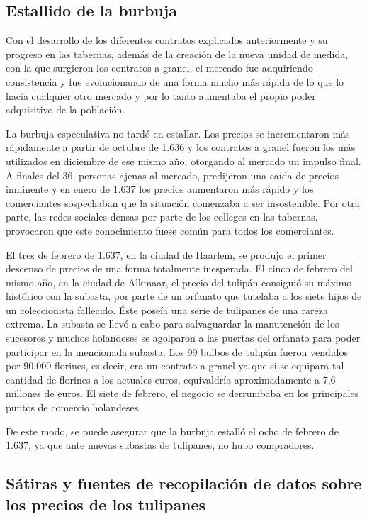 \subsection{Estallido de la burbuja}

Con el desarrollo de los diferentes contratos explicados anteriormente y su progreso en las tabernas, además de la creación de la nueva unidad de medida, con la que surgieron los contratos a granel, el mercado fue adquiriendo consistencia y fue evolucionando de una forma mucho más rápida de lo que lo hacía cualquier otro mercado y por lo tanto aumentaba el propio poder adquisitivo de la población.

La burbuja especulativa no tardó en estallar. Los precios se incrementaron más rápidamente a partir de octubre de 1.636 y los contratos a granel fueron los más utilizados en diciembre de ese mismo año, otorgando al mercado un impulso final. A finales del 36, personas ajenas al mercado, predijeron una caída de precios inminente y en enero de 1.637 los precios aumentaron más rápido y los comerciantes sospechaban que la situación comenzaba a ser insostenible. Por otra parte, las redes sociales densas por parte de los colleges en las tabernas, provocaron que este conocimiento fuese común para todos los comerciantes.

El tres de febrero de 1.637, en la ciudad de Haarlem, se produjo el primer descenso de precios de una forma totalmente inesperada. El cinco de febrero del mismo año, en la ciudad de Alkmaar, el precio del tulipán consiguió su máximo histórico con la subasta, por parte de un orfanato que tutelaba a los siete hijos de un coleccionista fallecido. Éste poseía una serie de tulipanes de una rareza extrema. La subasta se llevó a cabo para salvaguardar la manutención de los sucesores y muchos holandeses se agolparon a las puertas del orfanato para poder participar en la mencionada subasta. Los 99 bulbos de tulipán fueron vendidos por 90.000 florines, es decir, era un contrato a granel ya que si se equipara tal cantidad de florines a los actuales euros, equivaldría aproximadamente a 7,6 millones de euros. El siete de febrero, el negocio se derrumbaba en los principales puntos de comercio holandeses.

De este modo, se puede asegurar que la burbuja estalló el ocho de febrero de 1.637, ya que ante nuevas subastas de tulipanes, no hubo compradores.


\subsection{Sátiras y fuentes de recopilación de datos sobre los precios de los tulipanes}


